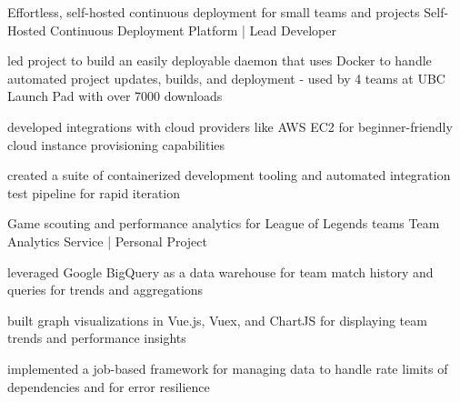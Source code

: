  
\begin{cventries}

  \cventry
    {Effortless, self-hosted continuous deployment for small teams and projects} %
    {Self-Hosted Continuous Deployment Platform | Lead Developer} %
    {} %
    {} %
    {
      \begin{cvitems} %
        \item {led project to build an easily deployable daemon that uses Docker to handle automated project updates, builds, and deployment - used by 4 teams at UBC Launch Pad with over 7000 downloads}
        \item {developed integrations with cloud providers like AWS EC2 for beginner-friendly cloud instance provisioning capabilities}
        \item{created a suite of containerized development tooling and automated integration test pipeline for rapid iteration}
      \end{cvitems}
    }

  \cventry
    {Game scouting and performance analytics for League of Legends teams} %
    {Team Analytics Service | Personal Project} %
    {} %
    {} %
    {
      \begin{cvitems} %
        \item {leveraged Google BigQuery as a data warehouse for team match history and queries for trends and aggregations}
        \item {built graph visualizations in Vue.js, Vuex, and ChartJS for displaying team trends and performance insights}
        \item {implemented a job-based framework for managing data to handle rate limits of dependencies and for error resilience}
      \end{cvitems}
    }


\end{cventries}
